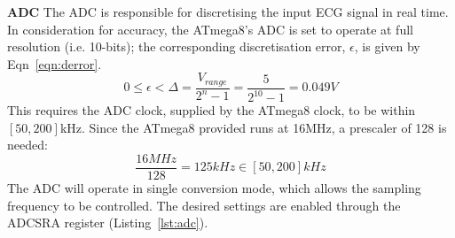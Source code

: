 \documentclass[11pt]{article}
\renewcommand\part[1]{\vspace{.10in}\textbf{#1}}
\begin{document}
\part{ADC} \newline
The ADC is responsible for discretising the input ECG signal in real time. In consideration for accuracy, the ATmega8's ADC is set to operate at full resolution (i.e. 10-bits); the corresponding discretisation error, $\epsilon$, is given by Eqn~\ref{eqn:derror}.
\begin{equation}
\label{eqn:derror}
0 \leq \epsilon < \Delta = \frac{V_{range}}{2^n-1} = \frac{5}{2^{10}-1} = 0.049V
\end{equation}
This requires the ADC clock, supplied by the ATmega8 clock, to be within $[50, 200]$kHz. Since the ATmega8 provided runs at 16MHz, a prescaler of 128 is needed:
\begin{equation*}
\frac{16MHz }{128} = 125kHz \in [50, 200]kHz
\end{equation*}
The ADC will operate in single conversion mode, which allows the sampling frequency to be controlled. The desired settings are enabled through the ADCSRA register (Listing~\ref{lst:adc}).
\end{document}
